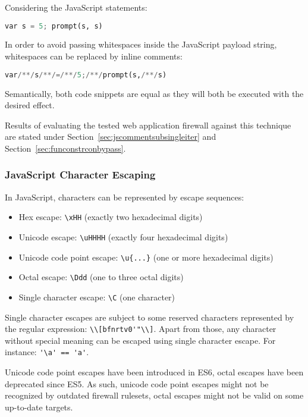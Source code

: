 Considering the JavaScript statements:

\begin{lstlisting}[style=basicStyle,language=Python]
var s = 5; prompt(s, s)
\end{lstlisting}

In order to avoid passing whitespaces inside the JavaScript payload string, whitespaces can be replaced by inline comments:

\begin{lstlisting}[style=basicStyle,language=Python]
var/**/s/**/=/**/5;/**/prompt(s,/**/s)
\end{lstlisting}

Semantically, both code snippets are equal as they will both be executed with the desired effect.

Results of evaluating the tested web application firewall against this technique are stated under Section~\ref{sec:jscommentsubsingleiter} and Section~\ref{sec:funconstrconbypass}.

\subsubsection{JavaScript Character Escaping}
\label{sec:jsescape}
In JavaScript, characters can be represented by escape sequences:

\begin{itemize}
	\item Hex escape: \verb|\xHH| (exactly two hexadecimal digits)
	\item Unicode escape: \verb|\uHHHH| (exactly four hexadecimal digits)
	\item Unicode code point escape: \verb|\u{...}| (one or more hexadecimal digits)
	\item Octal escape: \verb|\Ddd| (one to three octal digits)
	\item Single character escape: \verb|\C| (one character)
\end{itemize}

Single character escapes are subject to some reserved characters represented by the regular expression: \verb|\\[bfnrtv0'"\\]|. Apart from those, any character without special meaning can be escaped using single character escape. For instance: \verb|'\a' == 'a'|.

Unicode code point escapes have been introduced in ES6, octal escapes have been deprecated since ES5. As such, unicode code point escapes might not be recognized by outdated firewall rulesets, octal escapes might not be valid on some up-to-date targets.

